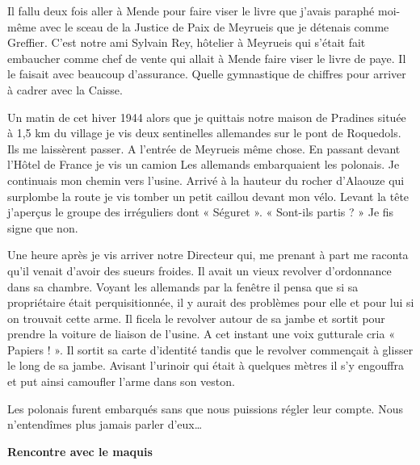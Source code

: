 \vspace{0.45cm}

Il fallu deux fois aller à Mende pour faire viser le livre que j’avais paraphé moi-même avec le
sceau de la Justice de Paix de Meyrueis que je détenais comme Greffier. C’est notre ami
Sylvain Rey, hôtelier à Meyrueis qui s’était fait embaucher comme chef de vente qui allait à
Mende faire viser le livre de paye. Il le faisait avec beaucoup d’assurance. Quelle
gymnastique de chiffres pour arriver à cadrer avec la Caisse.

\vspace{0.45cm}

Un matin de cet hiver 1944 alors que je quittais notre maison de Pradines située à 1,5 km du
village je vis deux sentinelles allemandes sur le pont de Roquedols. Ils me laissèrent passer. A
l’entrée de Meyrueis même chose. En passant devant l’Hôtel de France je vis un camion Les
allemands embarquaient les polonais. Je continuais mon chemin vers l’usine. Arrivé à la
hauteur du rocher d’Alaouze qui surplombe la route je vis tomber un petit caillou devant mon
vélo. Levant la tête j’aperçus le groupe des irréguliers dont « Séguret ». « Sont-ils partis ? »
Je fis signe que non.

\vspace{0.45cm}

Une heure après je vis arriver notre Directeur qui, me prenant à part me raconta qu’il venait
d’avoir des sueurs froides. Il avait un vieux revolver d’ordonnance dans sa chambre. Voyant
les allemands par la fenêtre il pensa que si sa propriétaire était perquisitionnée, il y aurait des
problèmes pour elle et pour lui si on trouvait cette arme. Il ficela le revolver autour de sa
jambe et sortit pour prendre la voiture de liaison de l’usine. A cet instant une voix gutturale
cria « Papiers ! ». Il sortit sa carte d’identité tandis que le revolver commençait à glisser le
long de sa jambe. Avisant l’urinoir qui était à quelques mètres il s’y engouffra et put ainsi
camoufler l’arme dans son veston.

\vspace{0.45cm}

Les polonais furent embarqués sans que nous puissions régler leur compte. Nous
n’entendîmes plus jamais parler d’eux…

\vspace{0.55cm}

\textbf{Rencontre avec le maquis}

\vspace{0.35cm}

